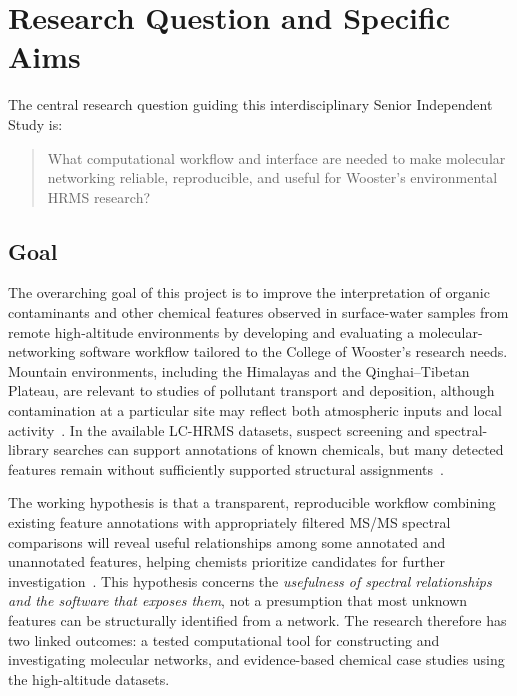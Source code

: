 \section{Research Question and Specific Aims}\label{sec:research-question}

    The central research question guiding this interdisciplinary Senior Independent Study is:

        \begin{quote}
            What computational workflow and interface are needed to make molecular networking reliable, reproducible, and useful for Wooster's environmental HRMS research?
        \end{quote}

    \subsection{Goal}\label{subsec:specific-aims-goal}
        The overarching goal of this project is to improve the interpretation of organic contaminants and other chemical features observed in surface-water samples from remote high-altitude environments by developing and evaluating a molecular-networking software workflow tailored to the College of Wooster's research needs. Mountain environments, including the Himalayas and the Qinghai--Tibetan Plateau, are relevant to studies of pollutant transport and deposition, although contamination at a particular site may reflect both atmospheric inputs and local activity~\cite{Daly2005,Xu2011,Ma2025}. In the available LC-HRMS datasets, suspect screening and spectral-library searches can support annotations of known chemicals, but many detected features remain without sufficiently supported structural assignments~\cite{Manz2023,Schulze2020,Hupatz2025}.

        The working hypothesis is that a transparent, reproducible workflow combining existing feature annotations with appropriately filtered MS/MS spectral comparisons will reveal useful relationships among some annotated and unannotated features, helping chemists prioritize candidates for further investigation~\cite{Wang2016,Bittremieux2022,DallaValle2025}. This hypothesis concerns the \emph{usefulness of spectral relationships and the software that exposes them}, not a presumption that most unknown features can be structurally identified from a network. The research therefore has two linked outcomes: a tested computational tool for constructing and investigating molecular networks, and evidence-based chemical case studies using the high-altitude datasets.

